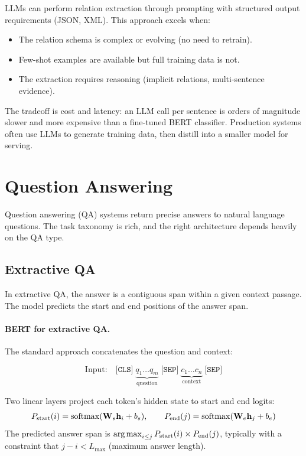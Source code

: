 LLMs can perform relation extraction through prompting with structured output requirements
(JSON, XML).  This approach excels when:
\begin{itemize}
    \item The relation schema is complex or evolving (no need to retrain).
    \item Few-shot examples are available but full training data is not.
    \item The extraction requires reasoning (implicit relations, multi-sentence evidence).
\end{itemize}

The tradeoff is cost and latency: an LLM call per sentence is orders of magnitude slower and
more expensive than a fine-tuned BERT classifier.  Production systems often use LLMs to
generate training data, then distill into a smaller model for serving.

\section{Question Answering}
\label{sec:question_answering}

Question answering (QA) systems return precise answers to natural language questions.  The
task taxonomy is rich, and the right architecture depends heavily on the QA type.

\subsection{Extractive QA}
\label{sec:extractive_qa}

In extractive QA, the answer is a contiguous span within a given context passage.  The model
predicts the start and end positions of the answer span.

\paragraph{BERT for extractive QA.}
The standard approach concatenates the question and context:

\[
\text{Input:} \quad \texttt{[CLS]}\; \underbrace{q_1 \ldots q_m}_{\text{question}}\;
\texttt{[SEP]}\; \underbrace{c_1 \ldots c_n}_{\text{context}}\; \texttt{[SEP]}
\]

Two linear layers project each token's hidden state to start and end logits:
\[
    P_{\text{start}}(i) = \operatorname{softmax}(\mathbf{W}_s \mathbf{h}_i + b_s), \qquad
    P_{\text{end}}(j) = \operatorname{softmax}(\mathbf{W}_e \mathbf{h}_j + b_e)
\]
The predicted answer span is $\operatorname*{arg\,max}_{i \leq j} P_{\text{start}}(i) \times P_{\text{end}}(j)$,
typically with a constraint that $j - i < L_{\max}$ (maximum answer length).

